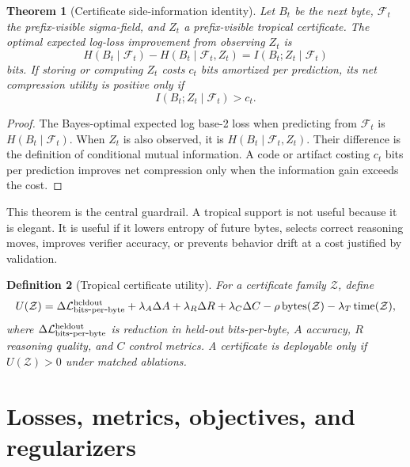 \documentclass[11pt]{article}
\newtheorem{definition}{Definition}[section]
\newtheorem{theorem}[definition]{Theorem}
\newcommand{\calL}{\mathcal{L}}
\newcommand{\calF}{\mathcal{F}}
\newcommand{\calZ}{\mathcal{Z}}
\newcommand{\bits}{\operatorname{bits\mbox{-}per\mbox{-}byte}}
\begin{document}
\begin{theorem}[Certificate side-information identity]
Let \(B_t\) be the next byte, \(\calF_t\) the prefix-visible sigma-field, and \(Z_t\) a prefix-visible tropical certificate.  The optimal expected log-loss improvement from observing \(Z_t\) is
\begin{equation}
H(B_t\mid\calF_t)-H(B_t\mid\calF_t,Z_t)=I(B_t;Z_t\mid\calF_t)
\end{equation}
bits.  If storing or computing \(Z_t\) costs \(c_t\) bits amortized per prediction, its net compression utility is positive only if
\begin{equation}
I(B_t;Z_t\mid\calF_t)>c_t.
\end{equation}
\end{theorem}
\begin{proof}
The Bayes-optimal expected log base-2 loss when predicting from \(\calF_t\) is \(H(B_t\mid\calF_t)\).  When \(Z_t\) is also observed, it is \(H(B_t\mid\calF_t,Z_t)\).  Their difference is the definition of conditional mutual information.  A code or artifact costing \(c_t\) bits per prediction improves net compression only when the information gain exceeds the cost.
\end{proof}

This theorem is the central guardrail.  A tropical support is not useful because it is elegant.  It is useful if it lowers entropy of future bytes, selects correct reasoning moves, improves verifier accuracy, or prevents behavior drift at a cost justified by validation.

\begin{definition}[Tropical certificate utility]
For a certificate family \(\calZ\), define
\begin{equation}
U(\calZ)=\Delta\calL_{\bits}^{\rm heldout}+\lambda_A\Delta A+\lambda_R\Delta R+\lambda_C\Delta C-\rho\operatorname{bytes}(\calZ)-\lambda_T\operatorname{time}(\calZ),
\end{equation}
where \(\Delta\calL_{\bits}^{\rm heldout}\) is reduction in held-out bits-per-byte, \(A\) accuracy, \(R\) reasoning quality, and \(C\) control metrics.  A certificate is deployable only if \(U(\calZ)>0\) under matched ablations.
\end{definition}

\section{Losses, metrics, objectives, and regularizers}
\end{document}
